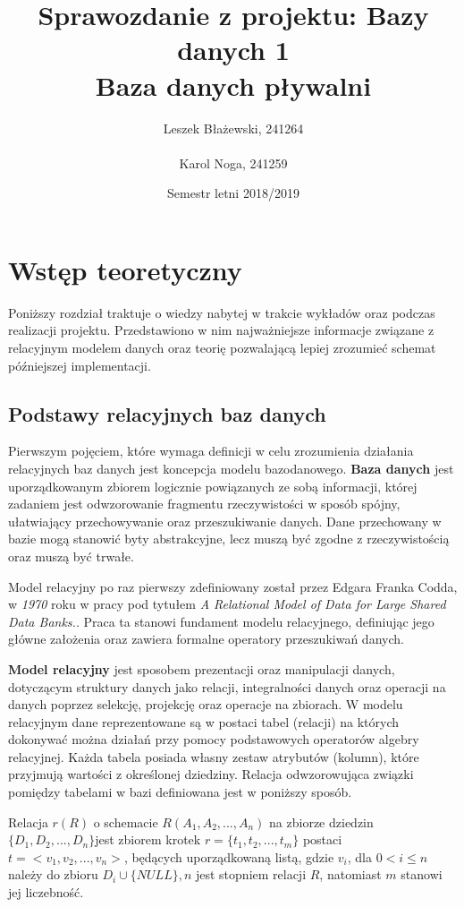 \documentclass[a4paper]{article}
\title{Sprawozdanie z projektu: Bazy danych 1\\Baza danych pływalni}
\author{Leszek Błażewski, 241264 \\ \\Karol Noga, 241259}
\date{Semestr letni 2018/2019}
\begin{document}
\maketitle
\thispagestyle{empty}
\clearpage
\setcounter{page}{1}
\tableofcontents
\newpage{}

\section{Wstęp teoretyczny}

Poniższy rozdział traktuje o wiedzy nabytej w trakcie wykładów oraz podczas realizacji projektu. Przedstawiono w nim najważniejsze informacje związane z relacyjnym modelem danych oraz teorię pozwalającą lepiej zrozumieć schemat późniejszej implementacji.

\subsection{Podstawy relacyjnych baz danych}

Pierwszym pojęciem, które wymaga definicji w celu zrozumienia działania relacyjnych baz danych jest koncepcja modelu bazodanowego. \textbf{Baza danych} jest uporządkowanym zbiorem logicznie powiązanych ze sobą informacji, której zadaniem jest odwzorowanie fragmentu rzeczywistości w sposób spójny, ułatwiający przechowywanie oraz przeszukiwanie danych. Dane przechowany w bazie mogą stanowić byty abstrakcyjne, lecz muszą być zgodne z rzeczywistością oraz muszą być trwałe.

Model relacyjny po raz pierwszy zdefiniowany został przez Edgara Franka Codda, w \textit{1970} roku w pracy pod tytułem \textit{A Relational Model of Data for Large Shared Data Banks.}. Praca ta stanowi fundament modelu relacyjnego, definiując jego główne założenia oraz zawiera formalne operatory przeszukiwań danych.

\textbf{Model relacyjny} jest sposobem prezentacji oraz manipulacji danych, dotyczącym struktury danych jako relacji, integralności danych oraz operacji na danych poprzez selekcję, projekcję oraz operacje na zbiorach. W modelu relacyjnym dane reprezentowane są w postaci tabel (relacji) na których dokonywać można działań przy pomocy podstawowych operatorów algebry relacyjnej. Każda tabela posiada własny zestaw atrybutów (kolumn), które przyjmują wartości z określonej dziedziny. Relacja odwzorowująca związki pomiędzy tabelami w bazi definiowana jest w poniższy sposób.

Relacja $r(R)$ o schemacie $R(A_1,A_2,...,A_n)$ na zbiorze dziedzin $\{D_1,D_2,...,D_n\}$jest zbiorem krotek $r=\{t_1,t_2,...,t_m\}$ postaci $t=< v_1,v_2,...,v_n>$, będących uporządkowaną listą, gdzie $v_i$, dla $0 < i \leq n $ należy do zbioru $D_i\cup\{NULL\},n$ jest stopniem relacji $R$, natomiast $m$ stanowi jej liczebność.
\end{document}
